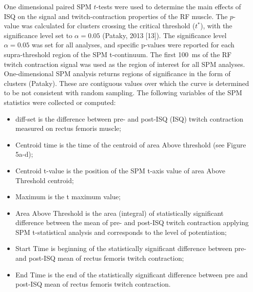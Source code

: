 \documentclass[utf8]{style/FrontiersinHarvard}
\begin{document}
One dimensional paired SPM $ t $-tests were used to determine the main effects of ISQ on the signal and twitch-contraction properties of the RF muscle.
The $ p $-value was calculated for clusters crossing the critical threshold ($ t^{*} $), with the significance level set to $ \alpha = 0.05 $ (Pataky, 2013 [13]).
The significance level $ \alpha = 0.05 $ was set for all analyses, and specific p-values were reported for each supra-threshold region of the SPM t-continuum.
The first \SI{100}{\milli \second} of the RF twitch contraction signal was used as the region of interest for all SPM analyses.
One-dimensional SPM analysis returns regions of significance in the form of clusters (Pataky).
These are contiguous values over which the curve is determined to be not consistent with random sampling.
The following variables of the SPM statistics were collected or computed:
\begin{itemize}

    \item diff-set is the difference between pre- and post-ISQ (ISQ) twitch contraction measured on rectus femoris muscle;

    \item Centroid time is the time of the centroid of area Above threshold (see Figure 5a-d);

    \item Centroid t-value is the position of the SPM t-axis value of area Above Threshold centroid;

    \item Maximum is the t maximum value;

    \item Area Above Threshold is the area (integral) of statistically significant difference between the mean of pre- and post-ISQ twitch contraction applying SPM t-statistical analysis and corresponds to the level of potentiation;

    \item Start Time is beginning of the statistically significant difference between pre- and post-ISQ mean of rectus femoris twitch contraction;

    \item End Time is the end of the statistically significant difference between pre and post-ISQ mean of rectus femoris twitch contraction.

\end{itemize}
\end{document}
